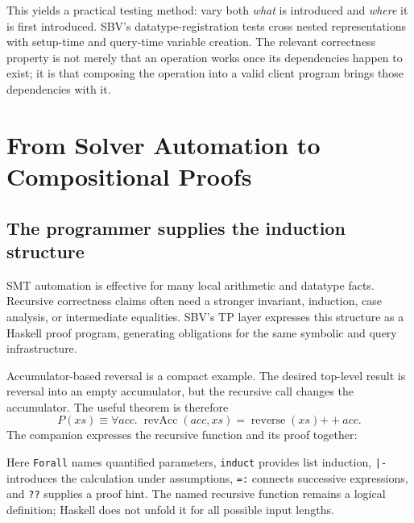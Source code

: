 \documentclass[acmsmall,screen,nonacm]{acmart}
\newcommand{\code}[1]{\texttt{#1}}
\newcommand{\paperlisting}[1]{\par\noindent
  \begin{minipage}{\linewidth}
  
  \end{minipage}\par}
\begin{document}
This yields a practical testing method: vary both \emph{what} is introduced
and \emph{where} it is first introduced. SBV's datatype-registration tests
cross nested representations with setup-time and query-time variable creation.
The relevant correctness property is not merely that an operation works once
its dependencies happen to exist; it is that composing the operation into a
valid client program brings those dependencies with it.

\section{From Solver Automation to Compositional Proofs}
\label{sec:proofs}

\subsection{The programmer supplies the induction structure}

SMT automation is effective for many local arithmetic and datatype facts.
Recursive correctness claims often need a stronger invariant, induction,
case analysis, or intermediate equalities. SBV's TP layer expresses this
structure as a Haskell proof program, generating obligations for the same
symbolic and query infrastructure.

Accumulator-based reversal is a compact example. The desired top-level result
is reversal into an empty accumulator, but the recursive call changes the
accumulator. The useful theorem is therefore
\[
 P(xs) \equiv \forall acc.\;
 \operatorname{revAcc}(acc,xs) = \operatorname{reverse}(xs) \mathbin{++} acc.
\]
The companion expresses the recursive function and its proof together:
\paperlisting{reverse}
Here \code{Forall} names quantified parameters, \code{induct} provides list
induction, \code{|-} introduces the calculation under assumptions, \code{=:}
connects successive expressions, and \code{??} supplies a proof hint. The named
recursive function remains a logical definition; Haskell does not unfold it
for all possible input lengths.
\end{document}
